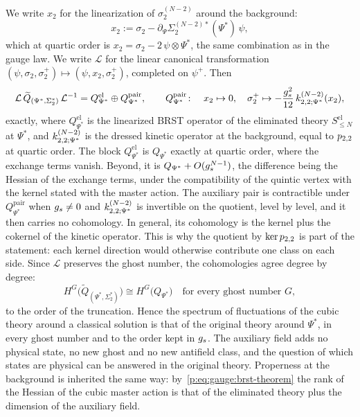 We write $x_2$ for the linearization of $\sigma_2^{(N-2)}$ around the background:
\begin{equation}
  \label{p:eq:gauge:x2}
  x_2
    := \sigma_2 - \partial_\Psi \Sigma_2^{(N-2)*}(\Psi^*) \, \psi,
\end{equation}
which at quartic order is $x_2 = \sigma_2 - 2 \, \psi \otimes \Psi^*$, the same combination as in the gauge law.
We write $\mathcal L$ for the linear canonical transformation $(\psi, \sigma_2, \sigma_2^+) \mapsto (\psi, x_2, \sigma_2^+)$, completed on $\psi^+$.
Then
\begin{equation}
  \label{p:eq:gauge:brst-theorem}
  \mathcal L \, \widetilde Q_{(\Psi^*, \Sigma_2^*)} \, \mathcal L^{-1}
    = Q^{\mathrm{el}}_{\Psi^*} \oplus Q^{\mathrm{pair}}_{\Psi^*},
  \qquad
  Q^{\mathrm{pair}}_{\Psi^*} \colon
  \quad
  x_2 \mapsto 0,
  \quad
  \sigma_2^+ \mapsto - \frac{\gs^2}{12} \, \kin{2}{\Psi^*}{N-2}(x_2),
\end{equation}
exactly, where $Q^{\mathrm{el}}_{\Psi^*}$ is the linearized BRST operator of the eliminated theory $S^{\mathrm{el}}_{\le N}$ at $\Psi^*$, and $\kin{2}{\Psi^*}{N-2}$ is the dressed kinetic operator at the background, equal to $p_{2,2}$ at quartic order.
The block $Q^{\mathrm{el}}_{\Psi^*}$ is $Q_{\Psi^*}$ exactly at quartic order, where the exchange terms vanish.
Beyond, it is $Q_{\Psi^*} + O(g_s^{N-1})$, the difference being the Hessian of the exchange terms, under the compatibility of the quintic vertex with the kernel stated with the master action.
The auxiliary pair is contractible under $Q^{\mathrm{pair}}_{\Psi^*}$ when $g_s \ne 0$ and $\kin{2}{\Psi^*}{N-2}$ is invertible on the quotient, level by level, and it then carries no cohomology.
In general, its cohomology is the kernel plus the cokernel of the kinetic operator.
This is why the quotient by $\ker p_{2,2}$ is part of the statement: each kernel direction would otherwise contribute one class on each side.
Since $\mathcal L$ preserves the ghost number, the cohomologies agree degree by degree:
\begin{equation}
  \label{p:eq:gauge:cohomology}
  H^G\big( \widetilde Q_{(\Psi^*, \Sigma_2^*)} \big)
    \cong H^G\big( Q_{\Psi^*} \big)
  \quad \text{for every ghost number } G,
\end{equation}
to the order of the truncation.
Hence the spectrum of fluctuations of the cubic theory around a classical solution is that of the original theory around $\Psi^*$, in every ghost number and to the order kept in $g_s$.
The auxiliary field adds no physical state, no new ghost and no new antifield class, and the question of which states are physical can be answered in the original theory.
Properness at the background is inherited the same way: by~\eqref{p:eq:gauge:brst-theorem} the rank of the Hessian of the cubic master action is that of the eliminated theory plus the dimension of the auxiliary field.

